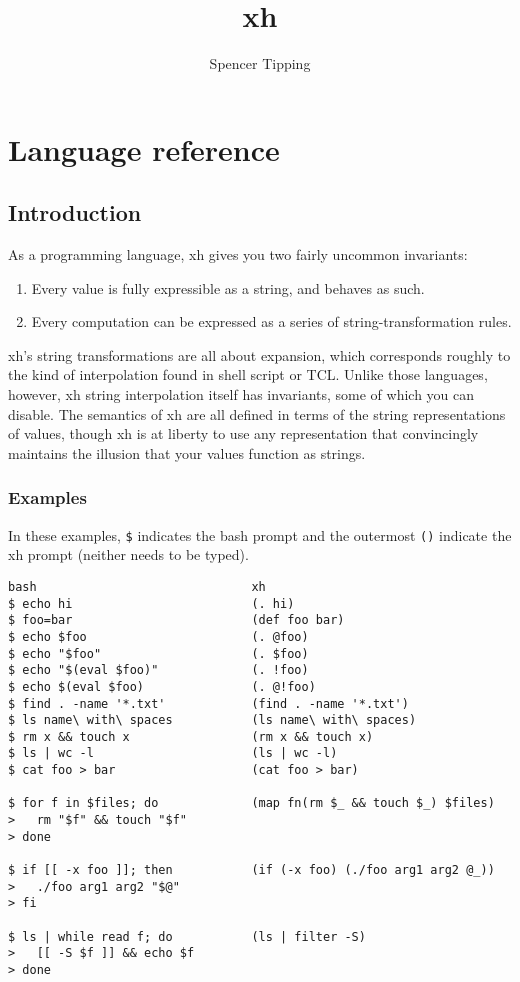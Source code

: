 \documentclass{report}
\title{xh}
\author{Spencer Tipping}
\begin{document}
\maketitle{}
\tableofcontents{}


\part{Language reference}\label{part:language-reference}
\chapter{Introduction}\label{chp:introduction}
  As a programming language, xh gives you two fairly uncommon invariants:

\begin{enumerate}
\item{Every value is fully expressible as a string, and behaves as such.}
       \label{item:values-are-strings}
\item{Every computation can be expressed as a series of}
       string-transformation rules.
       \label{item:computation-is-transformation}
\end{enumerate}

  xh's string transformations are all about expansion, which corresponds
  roughly to the kind of interpolation found in shell script or TCL. Unlike
  those languages, however, xh string interpolation itself has invariants, some
  of which you can disable. The semantics of xh are all defined in terms of the
  string representations of values, though xh is at liberty to use any
  representation that convincingly maintains the illusion that your values
  function as strings.

\section{Examples}\label{sec:examples}
    In these examples, \verb|$| indicates the bash prompt and the outermost
    \verb|()| indicate the xh prompt (neither needs to be typed).

\begin{verbatim}
bash                              xh
$ echo hi                         (. hi)
$ foo=bar                         (def foo bar)
$ echo $foo                       (. @foo)
$ echo "$foo"                     (. $foo)
$ echo "$(eval $foo)"             (. !foo)
$ echo $(eval $foo)               (. @!foo)
$ find . -name '*.txt'            (find . -name '*.txt')
$ ls name\ with\ spaces           (ls name\ with\ spaces)
$ rm x && touch x                 (rm x && touch x)
$ ls | wc -l                      (ls | wc -l)
$ cat foo > bar                   (cat foo > bar)

$ for f in $files; do             (map fn(rm $_ && touch $_) $files)
>   rm "$f" && touch "$f"
> done

$ if [[ -x foo ]]; then           (if (-x foo) (./foo arg1 arg2 @_))
>   ./foo arg1 arg2 "$@"
> fi

$ ls | while read f; do           (ls | filter -S)
>   [[ -S $f ]] && echo $f
> done
\end{verbatim}
\end{document}
